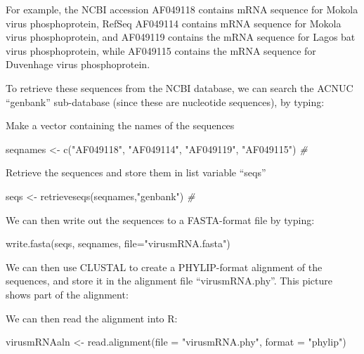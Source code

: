 \documentclass[
]{book}
\newenvironment{Shaded}{\begin{snugshade}}{\end{snugshade}}
\newcommand{\AttributeTok}[1]{\textcolor[rgb]{0.77,0.63,0.00}{#1}}
\newcommand{\CommentTok}[1]{\textcolor[rgb]{0.56,0.35,0.01}{\textit{#1}}}
\newcommand{\FunctionTok}[1]{\textcolor[rgb]{0.00,0.00,0.00}{#1}}
\newcommand{\NormalTok}[1]{#1}
\newcommand{\OtherTok}[1]{\textcolor[rgb]{0.56,0.35,0.01}{#1}}
\newcommand{\StringTok}[1]{\textcolor[rgb]{0.31,0.60,0.02}{#1}}
\begin{document}
For example, the NCBI accession AF049118 contains mRNA sequence for Mokola virus phosphoprotein, RefSeq AF049114 contains mRNA sequence for Mokola virus phosphoprotein, and AF049119 contains the mRNA sequence for Lagos bat virus phosphoprotein, while AF049115 contains the mRNA sequence for Duvenhage virus phosphoprotein.

To retrieve these sequences from the NCBI database, we can search the ACNUC ``genbank'' sub-database (since these are nucleotide sequences), by typing:

Make a vector containing the names of the sequences

\begin{Shaded}
\begin{Highlighting}[]
\NormalTok{seqnames }\OtherTok{\textless{}{-}} \FunctionTok{c}\NormalTok{(}\StringTok{"AF049118"}\NormalTok{, }\StringTok{"AF049114"}\NormalTok{, }\StringTok{"AF049119"}\NormalTok{, }\StringTok{"AF049115"}\NormalTok{)  }\CommentTok{\# }
\end{Highlighting}
\end{Shaded}

Retrieve the sequences and store them in list variable ``seqs''

\begin{Shaded}
\begin{Highlighting}[]
\NormalTok{seqs }\OtherTok{\textless{}{-}} \FunctionTok{retrieveseqs}\NormalTok{(seqnames,}\StringTok{"genbank"}\NormalTok{)                       }\CommentTok{\#}
\end{Highlighting}
\end{Shaded}

We can then write out the sequences to a FASTA-format file by typing:

\begin{Shaded}
\begin{Highlighting}[]
\FunctionTok{write.fasta}\NormalTok{(seqs, seqnames, }\AttributeTok{file=}\StringTok{"virusmRNA.fasta"}\NormalTok{)}
\end{Highlighting}
\end{Shaded}

We can then use CLUSTAL to create a PHYLIP-format alignment of the sequences, and store it in the alignment file ``virusmRNA.phy''. This picture shows part of the alignment:

We can then read the alignment into R:

\begin{Shaded}
\begin{Highlighting}[]
\NormalTok{virusmRNAaln  }\OtherTok{\textless{}{-}} \FunctionTok{read.alignment}\NormalTok{(}\AttributeTok{file =} \StringTok{"virusmRNA.phy"}\NormalTok{, }\AttributeTok{format =} \StringTok{"phylip"}\NormalTok{)}
\end{Highlighting}
\end{Shaded}
\end{document}

